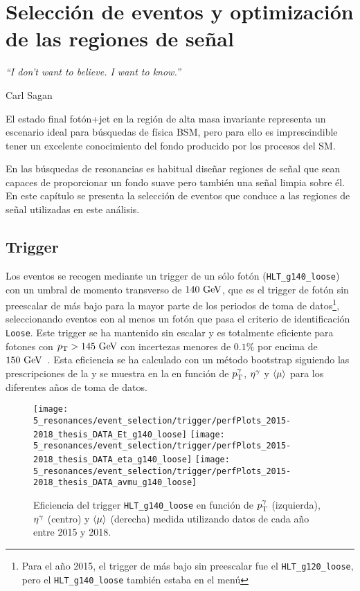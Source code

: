 \chapter{Selección de eventos y optimización de las regiones de señal}
\label{ch:evt_selection}
\epigraph{\emph{``I don't want to believe. I want to know.”}}{Carl Sagan}

El estado final fotón+jet en la región de alta masa invariante representa un escenario ideal para búsquedas de física \ac{BSM}, pero para ello es imprescindible tener un excelente conocimiento del fondo producido por los procesos del \ac{SM}.

En las búsquedas de resonancias es habitual diseñar regiones de señal que sean capaces de proporcionar un fondo suave pero también una señal limpia sobre él. En este capítulo se presenta la selección de eventos que conduce a las regiones de señal utilizadas en este análisis.


\section{Trigger}
\label{sec:evt_selection:trigger}

Los eventos se recogen mediante un trigger de un sólo fotón (\texttt{HLT\_g140\_loose}) con un umbral de momento transverso de \(140~\text{GeV}\), que es el trigger de fotón sin preescalar de más bajo \pt para la mayor parte de los periodos de toma de datos\footnote{Para el año 2015, el trigger de más bajo \pt sin preescalar fue el \texttt{HLT\_g120\_loose}, pero el \texttt{HLT\_g140\_loose} también estaba en el menú}, seleccionando eventos con al menos un fotón que pasa el criterio de identificación \texttt{Loose}. Este trigger se ha mantenido sin escalar y es totalmente eficiente para fotones con \(p_{\text{T}}>145~\text{GeV}\) con incertezas menores de \(0.1\%\) por encima de \(150~\text{GeV}\)~\cite{ATLAS-EGammaTrigger-Performance-Run2}. Esta eficiencia se ha calculado con un método bootstrap siguiendo las prescripciones de la  y se muestra en la \Fig{\ref{fig:evt_selection:trigger:trigger_perf_15_18}} en función de \(p_{\text{T}}^{\gamma}\), \(\eta^{\gamma}\) y \(\langle \mu \rangle\) para los diferentes años de toma de datos.

\begin{figure}[ht!]
    \centering
    \texttt{[image: 5\_resonances/event\_selection/trigger/perfPlots\_2015-2018\_thesis\_DATA\_Et\_g140\_loose]}
    \texttt{[image: 5\_resonances/event\_selection/trigger/perfPlots\_2015-2018\_thesis\_DATA\_eta\_g140\_loose]}
    \texttt{[image: 5\_resonances/event\_selection/trigger/perfPlots\_2015-2018\_thesis\_DATA\_avmu\_g140\_loose]}
    \caption{Eficiencia del trigger \texttt{HLT\_g140\_loose} en función de \(p_{\text{T}}^{\gamma}\) (izquierda), \(\eta^{\gamma}\) (centro) y \(\langle \mu \rangle\) (derecha) medida utilizando datos de cada año entre 2015 y 2018.}
    \label{fig:evt_selection:trigger:trigger_perf_15_18}
\end{figure}









